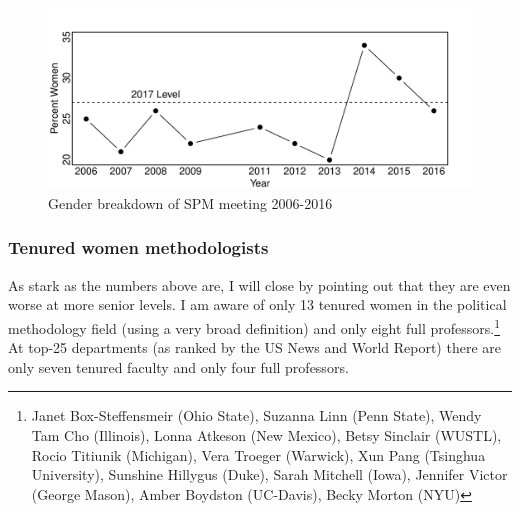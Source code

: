 \documentclass[12pt]{texMemo}
\begin{document}
\begin{figure}[htbp]
\caption{Gender breakdown of SPM meeting 2006-2016}
\vspace{-.3in}
\begin{center}
\includegraphics[scale=.9]{overTime}
\end{center}
\end{figure}


\newpage

\subsubsection*{Tenured women methodologists}

As stark as the numbers above are, I will close by pointing out that they are even worse at more senior levels. I am aware of only 13 tenured women in the political methodology field (using a very broad definition) and only eight full professors.\footnote{Janet Box-Steffensmeir (Ohio State), Suzanna Linn (Penn State), Wendy Tam Cho (Illinois), Lonna Atkeson (New Mexico), Betsy Sinclair (WUSTL), Rocio Titiunik (Michigan), Vera Troeger (Warwick), Xun Pang (Tsinghua University), Sunshine Hillygus (Duke), Sarah Mitchell (Iowa), Jennifer Victor (George Mason), Amber Boydston (UC-Davis), Becky Morton (NYU) } At top-25 departments (as ranked by the US News and World Report) there are only seven tenured faculty and only four full professors. 
\end{document}
